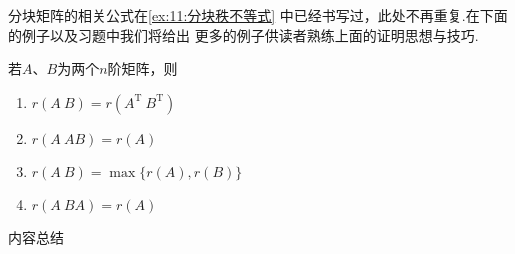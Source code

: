分块矩阵的相关公式在\autoref{ex:11:分块秩不等式} 中已经书写过，此处不再重复.在下面的例子以及习题中我们将给出
更多的例子供读者熟练上面的证明思想与技巧.
\begin{example}
    若$A$、$B$为两个$n$阶矩阵，则
    \begin{enumerate}[label=\Alph*.]
        \item $r(A\ B)=r(A^\mathrm{T}\ B^\mathrm{T})$

        \item $r(A\ AB)=r(A)$

        \item $r(A\ B)=\max\{r(A), r(B)\}$

        \item $r(A\ BA)=r(A)$
    \end{enumerate}
\end{example}
\begin{solution}

\end{solution}

\vspace{2ex}
\centerline{\heiti \Large 内容总结}

\vspace{2ex}

